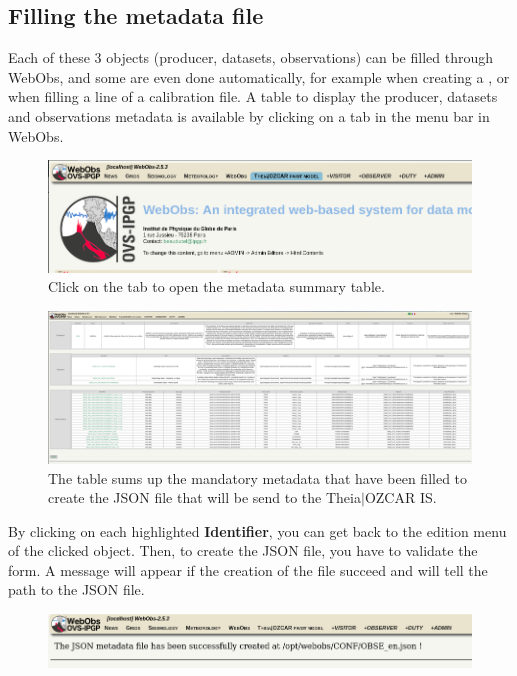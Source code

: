 \subsection{Filling the metadata file}

Each of these 3 objects (producer, datasets, observations) can be filled through WebObs, and some are even done automatically, for example when creating a , or when filling a line of a calibration file. A table to display the producer, datasets and observations metadata is available by clicking on a tab in the menu bar in WebObs.

\begin{figure}[!h]
	\centering
	\includegraphics[width=\textwidth]{figures/theia_tab.png}
	\caption{Click on the tab to open the metadata summary table.}
\end{figure}

\begin{figure}[!h]
	\centering
	\includegraphics[width=\textwidth]{figures/theia_recap_table.png}
	\caption{The table sums up the mandatory metadata that have been filled to create the JSON file that will be send to the Theia$\vert$OZCAR IS.}
\end{figure}

By clicking on each highlighted \textbf{Identifier}, you can get back to the edition menu of the clicked object. Then, to create the JSON file, you have to validate the form. A message will appear if the creation of the file succeed and will tell the path to the JSON file.

\begin{figure}[!hb]
	\centering
	\includegraphics[scale=0.4]{figures/creation_json_msg.png}
	\caption{}
\end{figure}

